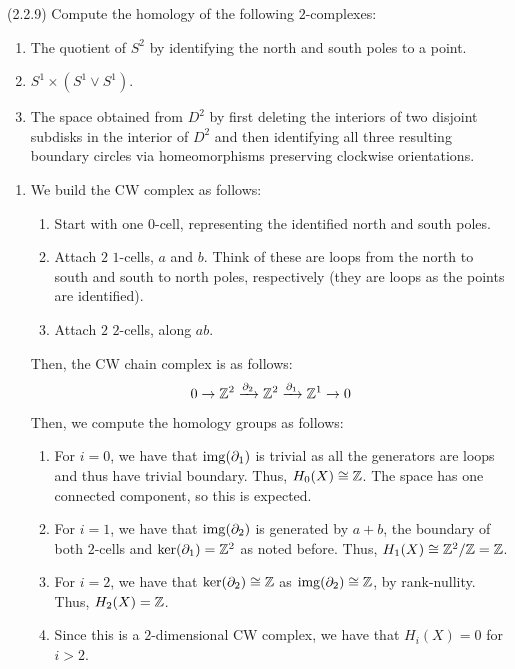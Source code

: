 \documentclass[12pt]{article}
\begin{document}



\begin{problem}{1}(2.2.9) Compute the homology of the following $2$-complexes:
\begin{enumerate}
	\item The quotient of $S^2$ by identifying the north and south poles to a point.
	\item $S^1 \times (S^1 \vee S^1)$.
	\item The space obtained from $D^2$ by first deleting the interiors of two disjoint subdisks in the interior of $D^2$ and then identifying all three resulting boundary circles via homeomorphisms preserving clockwise orientations.
\end{enumerate}
\end{problem}
\begin{solution}
    \bbni
    \begin{enumerate}
        \item We build the CW complex as follows: 
        \begin{enumerate}
            \item Start with one $0$-cell, representing the identified north and south poles.
            \item Attach $2$ $1$-cells, $a$ and $b$. Think of these are loops from the north to south and south to north poles, respectively (they are loops as the points are identified).
            \item Attach $2$ $2$-cells, along $ab$.  
        \end{enumerate}
        Then, the CW chain complex is as follows:
        \[ 0 \to \mathbb Z^2 \xrightarrow{\partial_2} \mathbb Z^2 \xrightarrow{\partial_1} \mathbb Z^1 \to 0\]
        Then, we compute the homology groups as follows:
        \begin{enumerate}
            \item For $i = 0$, we have that $\operatorname{img}(\partial_1)$ is trivial as all the generators are loops and thus have trivial boundary. Thus, $H_0(X) \cong \mathbb Z$. The space has one connected component, so this is expected.
            \item For $i = 1$, we have that $\operatorname{img}(\partial_2)$ is generated by $a+b$, the boundary of both $2$-cells and $\ker(\partial_1) = \mathbb Z^2$ as noted before. Thus, $H_1(X) \cong \mathbb Z^2/\mathbb Z = \mathbb Z$. 
            \item For $i = 2$, we have that $\ker(\partial_2) \cong \mathbb Z$ as $\operatorname{img}(\partial_2) \cong \mathbb Z$, by rank-nullity. Thus, $H_2(X) = \mathbb Z$.
            \item Since this is a $2$-dimensional CW complex, we have that $H_i(X) = 0$ for $i > 2$.

\end{enumerate}
\end{enumerate}
\end{solution}
\end{document}
